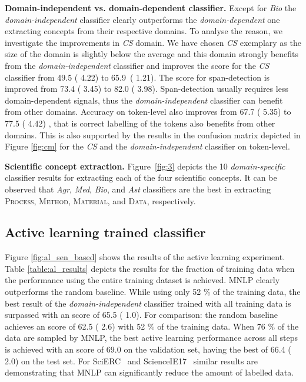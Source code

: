 \documentclass[runningheads]{llncs}
\begin{document}
\textbf{Domain-independent vs. domain-dependent classifier.}
Except for \textit{Bio} the \textit{domain-independent} classifier clearly outperforms the \textit{domain-dependent} one extracting concepts from their respective domains. To analyse the reason, we investigate the improvements in \textit{CS} domain. We have chosen \textit{CS} exemplary as the size of the domain is slightly below the average and this domain strongly benefits from the \textit{domain-independent} classifier and improves the  score for the \textit{CS} classifier from 49.5 ( 4.22) to 65.9~( 1.21). The  score for span-detection is improved from 73.4 ( 3.45) to 82.0 ( 3.98). Span-detection usually requires less domain-dependent signals, thus the \textit{domain-independent} classifier can benefit from other domains. 
Accuracy on token-level also improves from 67.7 ( 5.35) to 77.5 ( 4.42) , that is correct labelling of the tokens also benefits from other domains. This is also supported by the results in the confusion matrix depicted in Figure \ref{fig:cm} for the \textit{CS} and the \textit{domain-independent} classifier on token-level. 

\textbf{Scientific concept extraction.} 
Figure~\ref{fig:3} depicts the 10 \textit{domain-specific} classifier results for extracting each of the four scientific concepts.
It can be observed that \textit{Agr}, \textit{Med}, \textit{Bio}, and \textit{Ast} classifiers are the best in extracting \textsc{Process}, \textsc{Method}, \textsc{Material}, and \textsc{Data}, respectively.


\subsection{Active learning trained classifier}

Figure \ref{fig:al_sen_based} shows the results of the active learning experiment.
Table \ref{table:al_results} depicts the results for the fraction of training data when the performance using the entire training dataset is achieved. MNLP clearly outperforms the random baseline. While using only 52 \% of the training data, the best result of the \textit{domain-independent} classifier trained with all training data is surpassed with an  score of 65.5 ( 1.0). For comparison: the random baseline achieves an  score of 
62.5 ( 2.6) with 52 \% of the training data. 
When 76 \% of the data are sampled by MNLP, the best active learning performance across all steps is achieved with an 
 score of 69.0 on the validation set, having the best  of
66.4 ( 2.0) on the test set. 
For SciERC~\cite{Luan2018MultiTaskIO} and ScienceIE17~\cite{augenstein2017semeval} similar results are demonstrating that MNLP can significantly reduce the amount of labelled data.
\end{document}
